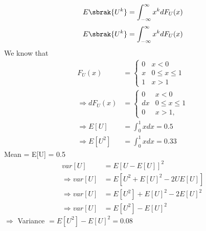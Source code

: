 \documentclass[journal,12pt,twocolumn]{IEEEtran}
\renewcommand\thesection{\arabic{section}}
\begin{document}
\begin{enumerate}[label=\thesection.\arabic*
,ref=\thesection.\theenumi]
%
\begin{equation}
E\sbrak{U^k} = \int_{-\infty}^{\infty}x^kdF_{U}(x)
\end{equation}
\begin{equation}
E\sbrak{U^k} = \int_{-\infty}^{\infty}x^kdF_{U}(x)
\end{equation}
\solution We know that
\begin{align}
    F_U(x) &= 
    \begin{cases}
    0 & x < 0 \\
    x &  0 \le x \le 1 \\
    1 & x > 1 
    \end{cases} \\
    \Rightarrow dF_U(x) &= 
    \begin{cases}
    0 & x < 0 \\
    dx &  0 \le x \le 1 \\
    0 & x > 1 ,
    \end{cases} \\ 
    \Rightarrow E[U] &= \int_{0}^{1} xdx  = 0.5 \\
    \Rightarrow E[U^2] &= \int_{0}^{1} xdx  = 0.33 
\end{align}
Mean = E[U] = 0.5 
\begin{align}
    var[U] &= E{[U-E[U]]}^2 \\
    \Rightarrow var[U] &= E[U^2+{E[U]}^2-2UE[U]] \\
    \Rightarrow var[U] &= E[U^2] + {E[U]}^2 -2{E[U]}^2 \\
    \Rightarrow var[U] &= E[U^2] - {E[U]}^2
\end{align}
$\Rightarrow$ Variance $= E[U^2] -E[U]^2 = 0.08 $
\end{enumerate}
\end{document}
